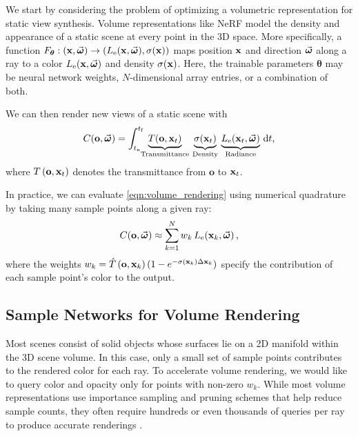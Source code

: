 \documentclass[10pt,twocolumn,letterpaper]{article}
\begin{document}
We start by considering the problem of optimizing a volumetric representation for static view synthesis.
Volume representations like NeRF \cite{MildeSTBRN2020} model the density and appearance of a static scene at every point in the 3D space.
More specifically, a function $F_{\boldsymbol\theta}: (\mathbf{x}, \vec{\boldsymbol{\omega}}) \rightarrow (L_\text{e}(\mathbf{x},\vec{\boldsymbol{\omega}}), \sigma(\mathbf{x}))$
maps position $\mathbf{x}$ and direction $\vec{\boldsymbol{\omega}}$ along a ray
to a color $L_\text{e}(\mathbf{x}, \vec{\boldsymbol{\omega}})$ and density $\sigma(\mathbf{x})$.
Here, the trainable parameters $\boldsymbol\theta$ may be neural network weights, $N$-dimensional array entries, or a combination of both.


We can then render new views of a static scene with
\begin{align}
    C(\mathbf{o}, \vec{\boldsymbol{\omega}}) = \int_{t_\text{n}}^{t_\text{f}} \!\!\!
    \underbrace{T\!\left(\mathbf{o}, \mathbf{x}_t\right)}_\text{\scriptsize Transmittance} \,
    \underbrace{\sigma\!\left(\mathbf{x}_t\right)}_\text{\scriptsize Density} \,
    \underbrace{L_\text{e}\!\left(\mathbf{x}_t, \vec{\boldsymbol{\omega}}\right)}_\text{\scriptsize Radiance} \, \mathrm{d}t \text{,}
\label{eqn:volume_rendering}
\end{align}
where $T\left(\mathbf{o}, \mathbf{x}_t\right)$ denotes the transmittance from $\mathbf{o}$ to $\mathbf{x}_t$.

In practice, we can evaluate \cref{eqn:volume_rendering} using numerical quadrature by taking many sample points along a given ray:
\begin{align}
    C(\mathbf{o}, \vec{\boldsymbol{\omega}}) \approx \sum_{k = 1}^{N} w_k \,
    L_\text{e}\!\left(\mathbf{x}_k, \vec{\boldsymbol{\omega}} \right) \text{,}
\label{eqn:quadrature}
\end{align}
where the weights $w_k = \hat{T}\left(\mathbf{o}, \mathbf{x}_k\right) (1 - e^{-\sigma(\mathbf{x}_k) \Delta\mathbf{x}_k})$ specify the contribution of each sample point's color to the output.


\subsection{Sample Networks for Volume Rendering}
\label{sec:sampling}


Most scenes consist of solid objects whose surfaces lie on a 2D manifold within the 3D scene volume.
In this case, only a small set of sample points contributes to the rendered color for each ray.
To accelerate volume rendering, we would like to query color and opacity only for points with non-zero $w_k$.
While most volume representations use importance sampling and pruning schemes that help reduce sample counts, they often require hundreds or even thousands of queries per ray to produce accurate renderings \cite{ChenXGYS2022, MuelleESK2022}.
\end{document}
